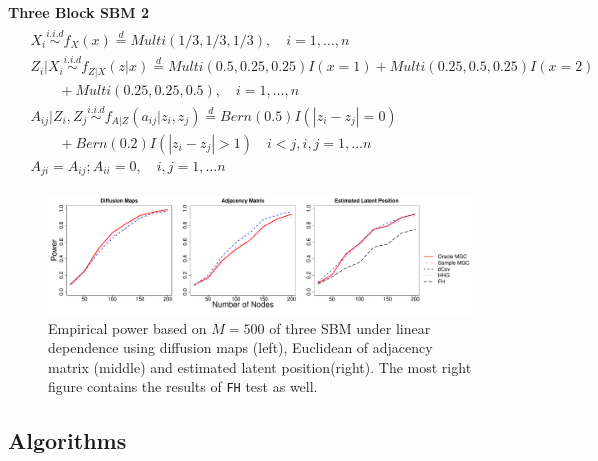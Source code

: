 \documentclass[12pt]{article}
\theoremstyle{definition}
\begin{document}
\textbf{Three Block SBM 2}
\begin{equation}
\begin{gathered}
\begin{aligned}
& X_{i} \overset{i.i.d}{\sim} f_{X}(x)   \stackrel{d}{=}  Multi(1/3, 1/3, 1/3), \quad i = 1, \ldots , n \\ & Z_{i} | X_{i}  \overset{i.i.d}{\sim}    f_{Z|X}(z|x)  \stackrel{d}{=}   Multi(0.5, 0.25, 0.25) I( x = 1 ) +   Multi(0.25, 0.5, 0.25) I (x = 2)   \\ &  \quad \quad + Multi(0.25, 0.25, 0.5), \quad  i = 1,\ldots,n  \\
& A_{ij} | Z_{i}, Z_{j}   \overset{i.i.d}{\sim}   f_{A|Z}(a_{ij} | z_{i}, z_{j})  \stackrel{d}{=} Bern(0.5) I ( |z_{i} - z_{j}| = 0 ) \\  &  \quad \quad + Bern(0.2) I(|z_{i} - z_{j}| > 1) \quad i < j, i,j=1, \ldots n \\ & A_{ji} = A_{ij} ;   A_{ii} = 0,   \quad  i,j=1, \ldots n
\end{aligned}
\end{gathered}
\end{equation}

\begin{figure}[H]
	\centering
	\includegraphics[width=7in]{../Figure/simplethreeSBM.pdf}
	\caption{Empirical power based on $M = 500$ of three SBM under linear dependence using diffusion maps (left), Euclidean of adjacency matrix (middle) and estimated latent position(right). The most right figure contains the results of \texttt{FH} test as well.}
		\label{fig:threeSBM}
\end{figure}
\newpage
\subsection{Algorithms}
\end{document}
